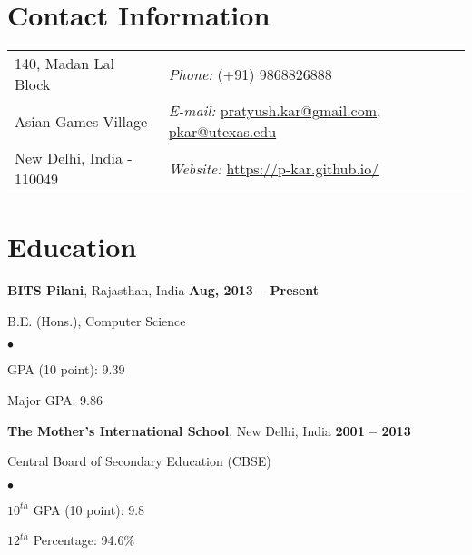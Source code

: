 \documentclass[margin,line]{res}
\newenvironment{list1}{
  \begin{list}{\ding{113}}{%
      \setlength{\itemsep}{0in}
      \setlength{\parsep}{0in} \setlength{\parskip}{0in}
      \setlength{\topsep}{0in} \setlength{\partopsep}{0in} 
      \setlength{\leftmargin}{0.17in}}}{\end{list}}
\newenvironment{list2}{
  \begin{list}{$\bullet$}{%
      \setlength{\itemsep}{0in}
      \setlength{\parsep}{0in} \setlength{\parskip}{0in}
      \setlength{\topsep}{0in} \setlength{\partopsep}{0in} 
      \setlength{\leftmargin}{0.2in}}}{\end{list}}
\begin{document}

\begin{resume}
\section{\sc Contact Information}
\vspace{.05in}
\begin{tabular}{@{}p{2in}p{4in}}
140, Madan Lal Block        & {\it Phone:} (+91) 9868826888 \\            
Asian Games Village         & {\it E-mail:} \href{mailto:pratyush.kar@gmail.com}{pratyush.kar@gmail.com}, \href{mailto:pkar@utexas.edu}{pkar@utexas.edu} \\         
New Delhi, India - 110049   & {\it Website:} \href{https://p-kar.github.io/}{https://p-kar.github.io/} \\    
\end{tabular}



\section{\sc Education}
{\bf BITS Pilani}, Rajasthan, India \hfill {\bf Aug, 2013 -- Present}\\
\vspace*{-.1in}
\begin{list1}
\item[] B.E. (Hons.), Computer Science
\begin{list2}
\vspace*{.05in}
\item GPA (10 point): 9.39
\item Major GPA: 9.86
\end{list2}
\vspace*{.05in}
\end{list1}

{\bf The Mother's International School}, New Delhi, India \hfill {\bf 2001 -- 2013}\\
\vspace*{-.1in}
\begin{list1}
\item[] Central Board of Secondary Education (CBSE)
\begin{list2}
\vspace*{.05in}
\item $10^{th}$ GPA (10 point): 9.8
\item $12^{th}$ Percentage: 94.6\%
\end{list2}
\vspace*{.05in}
\end{list1}



\end{resume}
\end{document}
